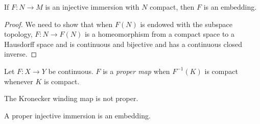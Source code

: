 \begin{prop}
If $F: N \to M$ is an injective immersion with $N$ compact, then $F$
is an embedding.
\end{prop}
\begin{proof}
We need to show that when $F(N)$ is endowed with the subspace topology,
$F: N \to F(N)$ is a homeomorphism from a compact space to a
Hausdorff space and is continuous and bijective and has a continuous
closed inverse.
\end{proof}

\begin{defn}
Let $F: X \to Y$ be continuous. $F$ is a \emph{proper map} when
$F^{-1}(K)$ is compact whenever $K$ is compact.
\end{defn}

The Kronecker winding map is not proper.

\begin{prop}
A proper injective immersion is an embedding.
\end{prop}
